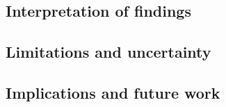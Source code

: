 \subsection{Interpretation of findings}

\subsection{Limitations and uncertainty}

\subsection{Implications and future work}

